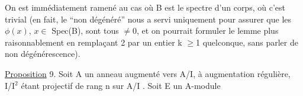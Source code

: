 On est immédiatement ramené au cas où B est le spectre d'un corps,
où c'est trivial (en fait, le ``non dégénéré'' nous a servi uniquement
 pour assurer que les $\phi(x)$, $x \in$ Spec(B), sont tous $\neq 0$, et on pourrait
formuler le lemme plus raisonnablement en remplaçant 2 par un entier
k $\geqslant$1 quelconque, sans parler de non dégénérescence).

\uline{Proposition} 9. Soit A un anneau augmenté vers A/I, à augmentation
régulière, I/I$^{2}$ étant projectif de rang n sur A/I . Soit E un A-module


